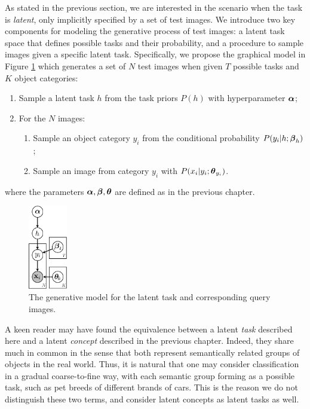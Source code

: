 As stated in the previous section, we are interested in the scenario when the task is \emph{latent}, \ie only implicitly specified by a set of test images. We introduce two key components for modeling the generative process of test images: a latent task space that defines possible tasks and their probability, and a procedure to sample images given a specific latent task. Specifically, we propose the graphical model in Figure \ref{fig:conceptgraph} which generates a set of $N$ test images when given $T$ possible tasks and $K$ object categories:
\begin{enumerate}
  \item Sample a latent task $h$ from the task priors $P(h)$ with hyperparameter $\boldsymbol{\alpha}$;
  \item For the $N$ images:
    \begin{enumerate}
        \item Sample an object category $y_i$ from the conditional probability $P(y_i|h; \boldsymbol{\beta}_{h})$;
        \item Sample an image from category $y_i$ with $P(x_i | y_i; \boldsymbol{\theta}_{y_i})$.
    \end{enumerate}
\end{enumerate}
where the parameters $\boldsymbol{\alpha}, \boldsymbol{\beta}, \boldsymbol{\theta}$ are defined as in the previous chapter.

\begin{figure}
  \centering
  \includegraphics[width=0.15\textwidth]{figs/taskadaptation/our_model_vertical.pdf} \hspace{0.25in}%
  \caption{The generative model for the latent task and corresponding query images.}\label{fig:conceptgraph}
\end{figure}

A keen reader may have found the equivalence between a latent \emph{task} described here and a latent \emph{concept} described in the previous chapter. Indeed, they share much in common in the sense that both represent semantically related groups of objects in the real world. Thus, it is natural that one may consider classification in a gradual coarse-to-fine way, with each semantic group forming as a possible task, such as pet breeds of different brands of cars. This is the reason we do not distinguish these two terms, and consider latent concepts as latent tasks as well.

